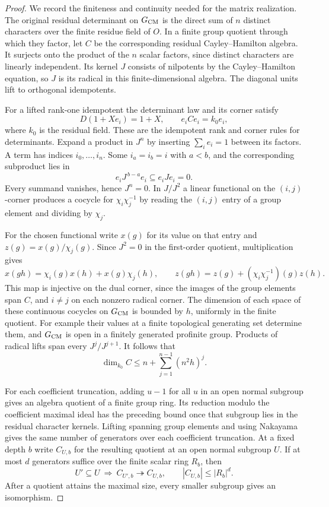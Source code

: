 \begin{proof}
We record the finiteness and continuity needed for the matrix
realization. The original residual determinant on \(G_{\rm CM}\)
is the direct sum of \(n\) distinct characters over the finite
residue field of \(O\). In a finite group quotient through
which they factor, let \(C\) be the corresponding residual
Cayley--Hamilton algebra. It surjects onto the product of the
\(n\) scalar factors, since distinct characters are linearly
independent. Its kernel \(J\) consists of nilpotents by the
Cayley--Hamilton equation, so \(J\) is its radical in this
finite-dimensional algebra. The diagonal units lift to
orthogonal idempotents.

For a lifted rank-one idempotent the determinant law and its corner satisfy
\[
 D(1+Xe_i)=1+X,\qquad e_iCe_i=k_0 e_i,
\]
where \(k_0\) is the residual field. These are the idempotent rank
and corner rules for determinants. Expand a product in \(J^n\) by inserting \(\sum_i e_i=1\) between
its factors. A term has indices \(i_0,\ldots,i_n\). Some
\(i_a=i_b=i\) with \(a<b\), and the corresponding subproduct lies in
\[
 e_iJ^{\,b-a}e_i\subseteq e_iJe_i=0.
\]
Every summand vanishes, hence \(J^n=0\).
In \(J/J^2\) a linear functional on the \((i,j)\)-corner
produces a cocycle for \(\chi_i\chi_j^{-1}\) by reading the
\((i,j)\) entry of a group element and dividing by \(\chi_j\).

For the chosen functional write \(x(g)\) for its value on that
entry and \(z(g)=x(g)/\chi_j(g)\). Since \(J^2=0\) in the first-order
quotient, multiplication gives
\[
 x(gh)=\chi_i(g)x(h)+x(g)\chi_j(h),\qquad
 z(gh)=z(g)+(\chi_i\chi_j^{-1})(g)z(h).
\]
This map is injective on the dual corner, since the images
of the group elements span \(C\), and \(i\ne j\) on each
nonzero radical corner. The dimension of each space of
these continuous cocycles on \(G_{\rm CM}\) is bounded by \(h\),
uniformly in the finite quotient. For example their values
at a finite topological generating set determine them,
and \(G_{\rm CM}\) is open in a finitely generated profinite group.
Products of radical lifts span every \(J^j/J^{j+1}\).
It follows that
\[
                 \dim_{k_0} C\le n+\sum_{j=1}^{n-1}(n^2 h)^j .
\]

For each coefficient truncation, adding \(u-1\) for all \(u\)
in an open normal subgroup gives an algebra quotient of a
finite group ring. Its reduction modulo the coefficient
maximal ideal has the preceding bound once that subgroup
lies in the residual character kernels. Lifting spanning
group elements and using Nakayama gives the same number
of generators over each coefficient truncation. At a fixed depth \(b\) write \(C_{U,b}\) for the resulting quotient at an open normal subgroup \(U\). If at most \(d\) generators suffice over the finite scalar ring \(R_b\), then 
\[
 U'\subseteq U\ \Longrightarrow\ C_{U',b}\twoheadrightarrow C_{U,b},\qquad |C_{U,b}|\le |R_b|^d.
\]
 After a quotient attains the maximal size, every smaller subgroup gives an isomorphism.


\end{proof}
